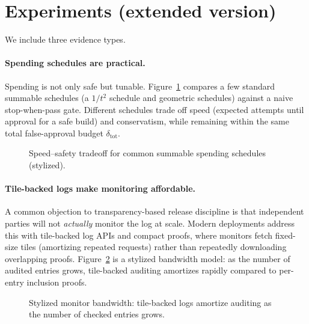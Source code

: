 \documentclass[11pt]{article}
\begin{document}
\section{Experiments (extended version)}
We include three evidence types.

\paragraph{Spending schedules are practical.}
Spending is not only safe but tunable. Figure~\ref{fig:tradeoff} compares a few standard summable schedules
(a $1/t^2$ schedule and geometric schedules) against a naive stop-when-pass gate.
Different schedules trade off speed (expected attempts until approval for a safe build) and conservatism,
while remaining within the same total false-approval budget $\delta_{\mathrm{tot}}$.

\begin{figure}[t]
\centering
{}
\caption{Speed--safety tradeoff for common summable spending schedules (stylized).}
\label{fig:tradeoff}
\end{figure}

\paragraph{Tile-backed logs make monitoring affordable.}
A common objection to transparency-based release discipline is that independent parties will not \emph{actually} monitor the log at scale.
Modern deployments address this with tile-backed log APIs and compact proofs, where monitors fetch fixed-size tiles (amortizing repeated requests) rather than repeatedly downloading overlapping proofs. \cite{c2sp_tlog_tiles,static_ct_api_spec,tesseract_blog_2025,cloudflare_azul_ct_2025}
Figure~\ref{fig:tile_cost} is a stylized bandwidth model: as the number of audited entries grows, tile-backed auditing amortizes rapidly compared to per-entry inclusion proofs.

\begin{figure}[t]
\centering
{}
\caption{Stylized monitor bandwidth: tile-backed logs amortize auditing as the number of checked entries grows.}
\label{fig:tile_cost}
\end{figure}
\end{document}
